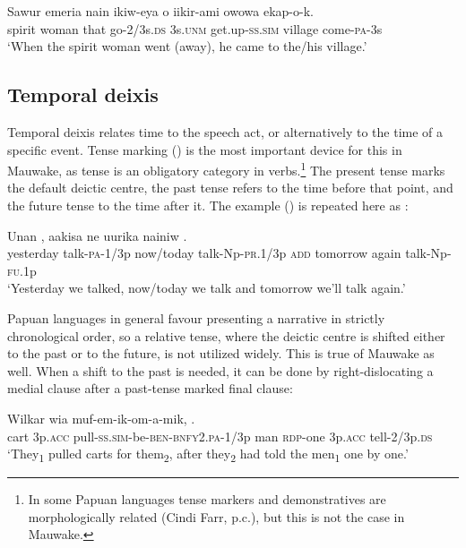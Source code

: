 \ea%
\label{ex:x1277}
\gll Sawur  emeria  nain  ikiw-eya  o  iikir-ami  owowa ekap-o-k. \\
spirit  woman  that  go-2/3s.\textsc{ds}  3s.\textsc{unm}  get.up-\textsc{ss}.\textsc{sim}  village come-\textsc{pa}-3s\\
\glt `When the spirit woman went (away), he came to the/his village.'
\z

\subsection{Temporal deixis}
{}
Temporal deixis relates time to the speech act, or alternatively to the time of a specific event. Tense marking () is the most important device for this in Mauwake, as tense is an obligatory category in verbs.\footnote{In some Papuan languages tense markers and demonstratives are morphologically related (Cindi Farr, p.c.), but this is not the case in Mauwake.} The present tense marks the default deictic centre, the past tense refers to the time before that point, and the future tense to the time after it. The example () 
is repeated here as :

\ea%
\label{ex:x1893}
\gll Unan  ,  aakisa    ne uurika  nainiw  .\\
yesterday  talk-\textsc{pa}-1/3p  now/today  talk-Np-\textsc{pr}.1/3p  \textsc{add} tomorrow  again  talk-Np-\textsc{fu}.1p\\
\glt `Yesterday we talked, now/today we talk and tomorrow we'll talk again.'
\z

Papuan languages in general favour presenting a narrative in strictly chronological order, so a relative tense, where the deictic centre is shifted either to the past or to the future, is not utilized widely. This is true of Mauwake as well. When a shift to the past is needed, it can be done by right-dislocating a medial clause after a past-tense marked final clause: 

\ea%
\label{ex:x1268}
\gll Wilkar  wia  muf-em-ik-om-a-mik,       .\\
cart  3p.\textsc{acc}  pull-\textsc{ss}.\textsc{sim}-be-\textsc{ben}-\textsc{bnfy}2.\textsc{pa}-1/3p  man \textsc{rdp}-one  3p.\textsc{acc}  tell-2/3p.\textsc{ds} \\
\glt `They\textsubscript{1} pulled carts for them\textsubscript{2}, after they\textsubscript{2} had told the men\textsubscript{1} one by one.'
\z

